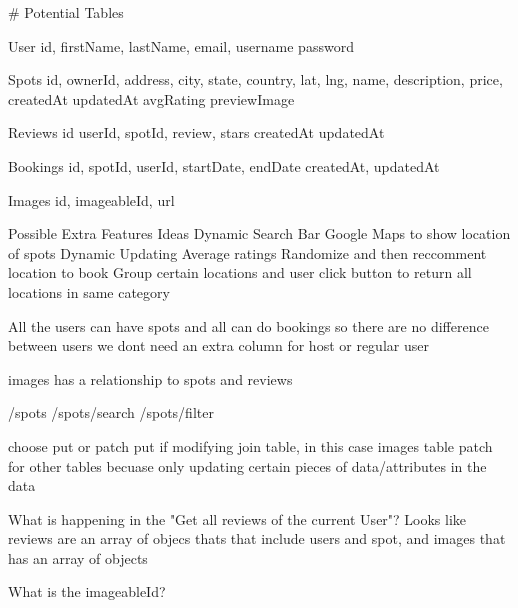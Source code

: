 # Potential Tables


User
    id,
    firstName,
    lastName,
    email,
    username
    password


Spots
    id,
    ownerId,
    address,
    city,
    state,
    country,
    lat,
    lng,
    name,
    description,
    price,
    createdAt
    updatedAt
    avgRating
    previewImage

Reviews
    id
    userId,
    spotId,
    review,
    stars
    createdAt
    updatedAt

Bookings
    id,
    spotId,
    userId,
    startDate,
    endDate
    createdAt,
    updatedAt

Images
    id,
    imageableId,
    url



Possible Extra Features Ideas
    Dynamic Search Bar
    Google Maps to show location of spots
    Dynamic Updating Average ratings
    Randomize and then reccomment location to book
    Group certain locations and user click button to return all locations in same category




All the users can have spots and all can do bookings so there are no difference between users
we dont need an extra column for host or regular user





images has a relationship to spots and reviews




/spots
/spots/search
/spots/filter



choose put or patch
put if modifying join table, in this case images table
patch for other tables becuase only updating certain pieces of data/attributes in the data

What is happening in the "Get all reviews of the current User"? Looks like reviews are an array of objecs thats that include users and spot, and images that has an array of objects


What is the imageableId?
